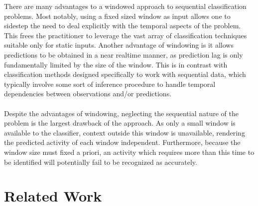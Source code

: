 \documentclass[12pt]{report}
\newcommand{\1}[0]{\mathbbm{1}}
\begin{document}
There are many advantages to a windowed approach to sequential classification problems.
Most notably, using a fixed sized window as input allows one to sidestep the need to deal
explicitly with the temporal aspects of the problem. This frees the practitioner
to leverage the vast array of classification techniques suitable only for static
inputs. Another advantage of windowing is it allows predictions to be obtained in
a near realtime manner, as prediction lag is only fundamentally limited by the size
of the window. This is in contrast with classification methods designed specifically
to work with sequential data, which typically involve some sort of inference procedure
to handle temporal dependencies between observations and/or predictions.
\\\\
Despite the advantages of windowing, neglecting the sequential nature of the problem
is the largest drawback of the approach. As only a small window is available
to the classifier, context outside this window is unavailable, rendering
the predicted activity of each window independent. Furthermore, because the
window size must fixed a priori, an activity which requires more than this time
to be identified will potentially fail to be recognized as accurately.

\section{Related Work}
\label{sec:HAR Related Work}
\end{document}
